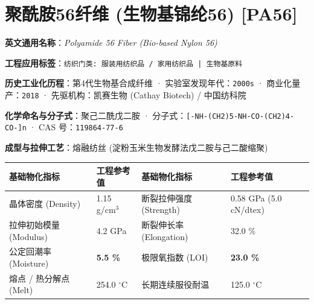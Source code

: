 \documentclass[11pt,openright,twoside,UTF8]{ctexbook}
\begin{document}
\section{聚酰胺56纤维 (生物基锦纶56) [PA56]}
\label{sec:pa56}

\noindent\textbf{英文通用名称}：\textit{Polyamide 56 Fiber (Bio-based Nylon 56)}\par
\noindent\textbf{工程应用标签}：\texttt{纺织门类: 服装用纺织品 / 家用纺织品 | 生物基原料}\par
\noindent\textbf{历史工业化历程}：第4代生物基合成纤维 · 实验室发现年代：\texttt{2000s} · 商业化量产：\texttt{2018} · 先驱机构：凯赛生物 (Cathay Biotech) / 中国纺科院\par
\noindent\textbf{化学命名与分子式}：聚己二酰戊二胺 · 分子式：\texttt{[-NH-(CH2)5-NH-CO-(CH2)4-CO-]n} · CAS 号：\texttt{119864-77-6}\par
\noindent\textbf{成型与拉伸工艺}：熔融纺丝 (淀粉玉米生物发酵法戊二胺与己二酸缩聚)\par

\vspace{0.15cm}
\begin{center}
\small
\begin{tabularx}{\textwidth}{p{3.8cm}Xp{3.8cm}X}
\toprule
\textbf{基础物化指标} & \textbf{工程参考值} & \textbf{基础物化指标} & \textbf{工程参考值} \\
\midrule
晶体密度 (Density) & 1.15 g/cm$^3$ & 断裂拉伸强度 (Strength) & 0.58 GPa (5.0 cN/dtex) \\
拉伸初始模量 (Modulus) & 4.2 GPa & 断裂伸长率 (Elongation) & 32.0 \% \\
公定回潮率 (Moisture) & \textbf{5.5 \%} & 极限氧指数 (LOI) & \textbf{23.0 \%} \\
熔点 / 热分解点 (Melt) & 254.0 $^\circ\mathrm{C}$ & 长期连续服役耐温 & 125.0 $^\circ\mathrm{C}$ \\
\bottomrule
\end{tabularx}
\end{center}
\vspace{0.15cm}
\end{document}
